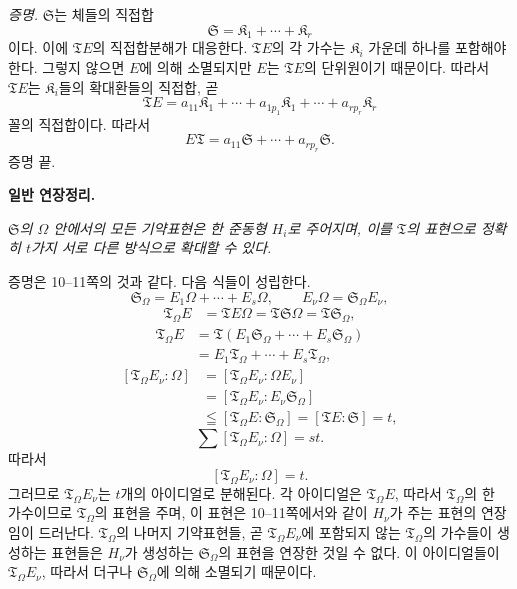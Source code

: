 \emph{증명.} \(\mathfrak S\)는 체들의 직접합
\[
        \mathfrak S=\mathfrak K_1+\cdots+\mathfrak K_r
\]
이다. 이에 \(\mathfrak T E\)의 직접합분해가 대응한다. \(\mathfrak T E\)의 각 가수는 \(\mathfrak K_i\) 가운데 하나를 포함해야 한다. 그렇지 않으면 \(E\)에 의해 소멸되지만 \(E\)는 \(\mathfrak T E\)의 단위원이기 때문이다. 따라서 \(\mathfrak T E\)는 \(\mathfrak K_i\)들의 확대환들의 직접합, 곧
\[
        \mathfrak T E
        =a_{11}\mathfrak K_1+\cdots+a_{1p_1}\mathfrak K_1
        +\cdots+a_{rp_r}\mathfrak K_r
\]
꼴의 직접합이다. 따라서
\[
        E\mathfrak T
        =a_{11}\mathfrak S+\cdots+a_{rp_r}\mathfrak S.
\]
증명 끝.

\begin{center}
\textbf{일반 연장정리.}
\end{center}

\emph{\(\mathfrak S\)의 \(\Omega\) 안에서의 모든 기약표현은 한 준동형 \(H_i\)로 주어지며, 이를 \(\mathfrak T\)의 표현으로 정확히 \(t\)가지 서로 다른 방식으로 확대할 수 있다.}

증명은 10--11쪽의 것과 같다. 다음 식들이 성립한다.
\[
        \mathfrak S_\Omega
        =E_1\Omega+\cdots+E_s\Omega,
        \qquad
        E_\nu\Omega=\mathfrak S_\Omega E_\nu,
\]
\[
\begin{aligned}
\mathfrak T_\Omega E
&=\mathfrak T E\Omega
 =\mathfrak T\mathfrak S\Omega
 =\mathfrak T\mathfrak S_\Omega,
\end{aligned}
\]
\[
\begin{aligned}
\mathfrak T_\Omega E
&=\mathfrak T(E_1\mathfrak S_\Omega+\cdots
  +E_s\mathfrak S_\Omega)\\
&=E_1\mathfrak T_\Omega+\cdots
  +E_s\mathfrak T_\Omega,
\end{aligned}
\]
\[
\begin{aligned}
[\mathfrak T_\Omega E_\nu:\Omega]
&=[\mathfrak T_\Omega E_\nu:\Omega E_\nu]\\
&=[\mathfrak T_\Omega E_\nu:E_\nu\mathfrak S_\Omega]\\
&\leqq[\mathfrak T_\Omega E:\mathfrak S_\Omega]
 =[\mathfrak T E:\mathfrak S]=t,
\end{aligned}
\]
\[
        \sum[\mathfrak T_\Omega E_\nu:\Omega]=st.
\]
따라서
\[
        [\mathfrak T_\Omega E_\nu:\Omega]=t.
\]
그러므로 \(\mathfrak T_\Omega E_\nu\)는 \(t\)개의 아이디얼로 분해된다. 각 아이디얼은 \(\mathfrak T_\Omega E\), 따라서 \(\mathfrak T_\Omega\)의 한 가수이므로 \(\mathfrak T_\Omega\)의 표현을 주며, 이 표현은 10--11쪽에서와 같이 \(H_\nu\)가 주는 표현의 연장임이 드러난다. \(\mathfrak T_\Omega\)의 나머지 기약표현들, 곧 \(\mathfrak T_\Omega E_\nu\)에 포함되지 않는 \(\mathfrak T_\Omega\)의 가수들이 생성하는 표현들은 \(H_\nu\)가 생성하는 \(\mathfrak S_\Omega\)의 표현을 연장한 것일 수 없다. 이 아이디얼들이 \(\mathfrak T_\Omega E_\nu\), 따라서 더구나 \(\mathfrak S_\Omega\)에 의해 소멸되기 때문이다.

